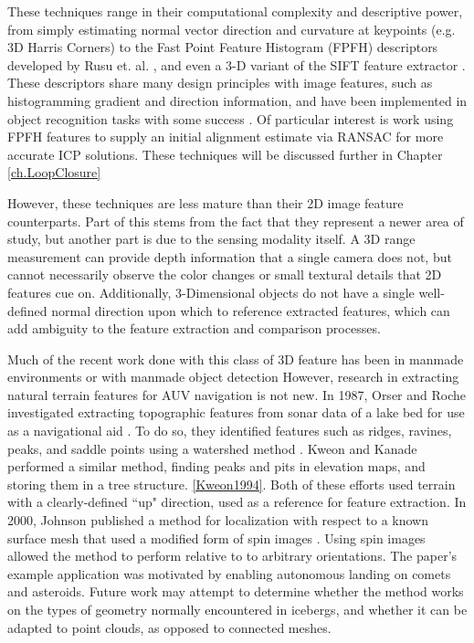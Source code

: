 These techniques range in their computational complexity and descriptive power, from simply estimating normal vector direction and curvature at keypoints (e.g. 3D Harris Corners) to the Fast Point Feature Histogram (FPFH) descriptors developed by Rusu et. al. \cite{}, and even a 3-D variant of the SIFT feature extractor \cite{}. These descriptors share many design principles with image features, such as histogramming gradient and direction information, and have been implemented in object recognition tasks with some success \cite{FPFH}. Of particular interest is work using FPFH features to supply an initial alignment estimate via RANSAC for more accurate ICP solutions. These techniques will be discussed further in Chapter \ref{ch.LoopClosure}

However, these techniques are less mature than their 2D image feature counterparts. Part of this stems from the fact that they represent a newer area of study, but another part is due to the sensing modality itself. A 3D range measurement  can provide depth information that a single camera does not, but cannot necessarily observe the color changes or small textural details that 2D features cue on. Additionally, 3-Dimensional objects do not have a single well-defined normal direction upon which to reference extracted features, which can add ambiguity to the feature extraction and comparison processes. 

Much of the recent work done with this class of 3D feature has been in manmade environments or with manmade object detection \cite{??} However, research in extracting natural terrain features for AUV navigation is not new. In 1987, Orser and Roche investigated extracting topographic features from sonar data of a lake bed for use as a navigational aid \cite{Orser1987}. To do so, they identified features such as ridges, ravines, peaks, and saddle points using a watershed method \cite{watershed}. Kweon and Kanade performed a similar method, finding peaks and pits in elevation maps, and storing them in a tree structure. \ref{Kweon1994}. Both of these efforts used terrain with a clearly-defined ``up" direction, used as a reference for feature extraction. In 2000, Johnson published a method for localization with respect to a known surface mesh that used a modified form of spin images \cite{Johnson1999} \cite{Johnson2000}. Using spin images allowed the method to perform relative to to arbitrary orientations. The paper's example application was motivated by enabling autonomous landing on comets and asteroids. Future work may attempt to determine whether the method works on the types of geometry normally encountered in icebergs, and whether it can be adapted to point clouds, as opposed to connected meshes. 

